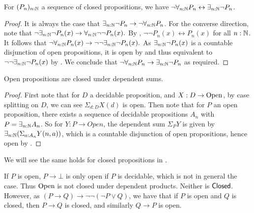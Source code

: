 \begin{lemma}\label{ClosedMarkov}
  For $(P_n)_{n:\mathbb{N}}$ a sequence of closed propositions, we have 
  $\neg \forall_{n:\mathbb{N}} P_n \leftrightarrow  \exists_{n:\mathbb{N}} \neg P_n$. 
\end{lemma}
\begin{proof}
  It is always the case that $\exists_{n:\mathbb{N}}\neg P_n \to \neg \forall_{n:\mathbb{N}} P_n$. 
  For the converse direction,
  note that $\neg \exists_{n:\mathbb{N}} \neg P_n(x) \to \forall_{n:\mathbb{N}} \neg \neg P_n(x).$
  By , $\neg \neg  P_n(x)\leftrightarrow P_n(x)$ for all $n:\mathbb{N}$. 
  It follows that 
  $\neg \forall_{n:\mathbb{N}} P_n(x)\to 
  \neg \neg \exists_{n:\mathbb{N}} \neg P_n(x).$
  As $\exists_{n:\mathbb{N}}\neg P_n(x)$ is a countable disjunction of open propositions, 
  it is open by  and thus equivalent to 
  $\neg\neg\exists_{n:\mathbb{N}} \neg P_n(x)$ by .
  We conclude that $\neg \forall_{n:\mathbb{N}} P_n \to \exists_{n:\mathbb{N}} \neg P_n$ as required. 
\end{proof} 









\begin{lemma}\label{OpenDependentSums}
  Open propositions are closed under dependent sums.
\end{lemma}
\begin{proof}
  First note that for $D$ a decidable proposition, and $X:D \to \mathrm{Open}$,
  by case splitting on $D$, we can see 
  $\Sigma_{d:D} X(d)$ is open.
%
  Then note that for $P$ an open proposition, 
  there exists a sequence of decidable propositions $A_n$ with 
  $P = \exists_{n:\mathbb{N}} A_n $.
%
  So for $Y : P \to Open $, the dependent sum $\Sigma_P Y$ is given by 
  $\exists_{n:\mathbb{N}} (\Sigma_{a:A_n} Y(n,a))$,
  which is a countable disjunction of open propositions, 
  hence open by .
\end{proof}

We will see the same holds for closed propositions in .

\begin{remark}\label{ImplicationOpenClosed}
  If $P$ is open, $P \to \bot$ is only open if $P$ is decidable, which is not in general the case. 
  Thus $\mathrm{Open}$ is not closed under dependent products. Neither is $\mathsf{Closed}$. 
  However, as $(P\to Q)  \to \neg \neg (\neg P \vee Q)$,
  we have that if $P$ is open and $Q$ is closed, then $P\to Q$ is closed, and similarly $Q\to P$ is open.
\end{remark}
